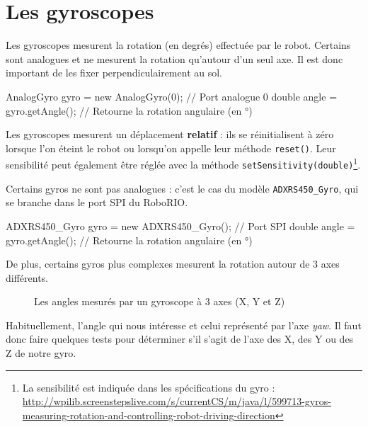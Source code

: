 \documentclass[12pt]{report}
\begin{document}
\section{Les gyroscopes}

Les gyroscopes mesurent la rotation (en degrés) effectuée par le robot. Certains sont analogues et ne mesurent la rotation qu'autour d'un seul axe. Il est donc important de les fixer perpendiculairement au sol.

\begin{code}
AnalogGyro gyro = new AnalogGyro(0); // Port analogue 0
double angle = gyro.getAngle(); // Retourne la rotation angulaire (en °)
\end{code}

Les gyroscopes mesurent un déplacement \textbf{relatif} : ils se réinitialisent à zéro lorsque l'on éteint le robot ou lorsqu'on appelle leur méthode \texttt{reset()}. Leur sensibilité peut également être réglée avec la méthode \texttt{setSensitivity(double)}\footnote{La sensibilité est indiquée dans les spécifications du gyro : \url{http://wpilib.screenstepslive.com/s/currentCS/m/java/l/599713-gyros-measuring-rotation-and-controlling-robot-driving-direction}}.

Certains gyros ne sont pas analogues : c'est le cas du modèle \texttt{ADXRS450\_Gyro}, qui se branche dans le port SPI du RoboRIO.

\begin{code}
ADXRS450_Gyro gyro = new ADXRS450_Gyro(); // Port SPI
double angle = gyro.getAngle(); // Retourne la rotation angulaire (en °)
\end{code}

De plus, certains gyros plus complexes mesurent la rotation autour de 3 axes différents.

\begin{figure}[!htbp]
  \centering
  \def\svgwidth{0.5\textwidth}
  
  \caption[Les angles mesurés par un gyroscope à 3 axes (X, Y et Z)]{Les angles mesurés par un gyroscope à 3 axes (X, Y et Z) \footnotemark{}}
\end{figure}

Habituellement, l'angle qui nous intéresse et celui représenté par l'axe \textit{yaw}. Il faut donc faire quelques tests pour déterminer s'il s'agit de l'axe des X, des Y ou des Z de notre gyro.
\end{document}
